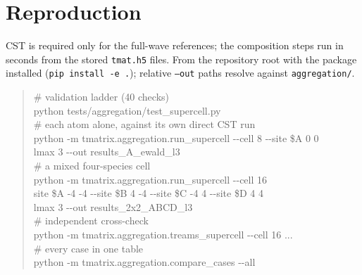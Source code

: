 \documentclass[11pt,a4paper]{article}
\newcommand{\code}[1]{\texttt{\small #1}}
\theoremstyle{plain}
\theoremstyle{definition}
\begin{document}
\section{Reproduction}
\label{app:repro}

CST is required only for the full-wave references; the composition steps run in
seconds from the stored \code{tmat.h5} files. From the repository root with the
package installed (\code{pip install -e .}); relative \code{--out} paths resolve
against \code{aggregation/}.

\begin{quote}\ttfamily\small
\# validation ladder (40 checks)\\
python tests/aggregation/test\_supercell.py\\[1ex]
\# each atom alone, against its own direct CST run\\
python -m tmatrix.aggregation.run\_supercell {-}{-}cell 8 {-}{-}site \$A 0 0 \\
\hspace*{2em}{-}{-}lmax 3 {-}{-}out results\_A\_ewald\_l3\\[1ex]
\# a mixed four-species cell\\
python -m tmatrix.aggregation.run\_supercell {-}{-}cell 16 \\
\hspace*{2em}{-}{-}site \$A -4 -4 {-}{-}site \$B 4 -4 {-}{-}site \$C -4 4 {-}{-}site \$D 4 4 \\
\hspace*{2em}{-}{-}lmax 3 {-}{-}out results\_2x2\_ABCD\_l3\\[1ex]
\# independent cross-check\\
python -m tmatrix.aggregation.treams\_supercell {-}{-}cell 16 ... \\[1ex]
\# every case in one table\\
python -m tmatrix.aggregation.compare\_cases {-}{-}all
\end{quote}
\end{document}

